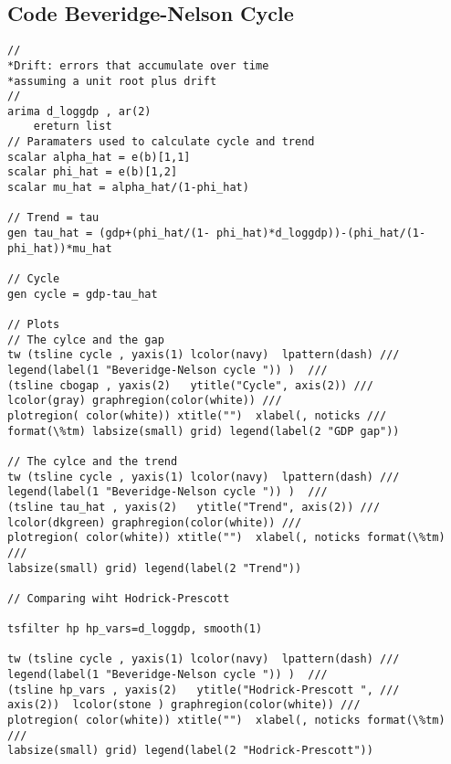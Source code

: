 \documentclass[11pt]{article}
\begin{document}
\subsection{Code Beveridge-Nelson Cycle}
\begin{verbatim}
//
*Drift: errors that accumulate over time
*assuming a unit root plus drift
//
arima d_loggdp , ar(2)
	ereturn list
// Paramaters used to calculate cycle and trend
scalar alpha_hat = e(b)[1,1]
scalar phi_hat = e(b)[1,2]
scalar mu_hat = alpha_hat/(1-phi_hat)

// Trend = tau
gen tau_hat = (gdp+(phi_hat/(1- phi_hat)*d_loggdp))-(phi_hat/(1-phi_hat))*mu_hat

// Cycle 
gen cycle = gdp-tau_hat

// Plots
// The cylce and the gap
tw (tsline cycle , yaxis(1) lcolor(navy)  lpattern(dash) ///
legend(label(1 "Beveridge-Nelson cycle ")) )  ///
(tsline cbogap , yaxis(2)   ytitle("Cycle", axis(2)) ///
lcolor(gray) graphregion(color(white)) ///
plotregion( color(white)) xtitle("")  xlabel(, noticks ///
format(\%tm) labsize(small) grid) legend(label(2 "GDP gap")) 

// The cylce and the trend
tw (tsline cycle , yaxis(1) lcolor(navy)  lpattern(dash) ///
legend(label(1 "Beveridge-Nelson cycle ")) )  ///
(tsline tau_hat , yaxis(2)   ytitle("Trend", axis(2)) ///
lcolor(dkgreen) graphregion(color(white)) ///
plotregion( color(white)) xtitle("")  xlabel(, noticks format(\%tm) ///
labsize(small) grid) legend(label(2 "Trend")) 

// Comparing wiht Hodrick-Prescott 

tsfilter hp hp_vars=d_loggdp, smooth(1)

tw (tsline cycle , yaxis(1) lcolor(navy)  lpattern(dash) ///
legend(label(1 "Beveridge-Nelson cycle ")) )  ///
(tsline hp_vars , yaxis(2)   ytitle("Hodrick-Prescott ", ///
axis(2))  lcolor(stone ) graphregion(color(white)) ///
plotregion( color(white)) xtitle("")  xlabel(, noticks format(\%tm) ///
labsize(small) grid) legend(label(2 "Hodrick-Prescott")) 
\end{verbatim}
\end{document}
